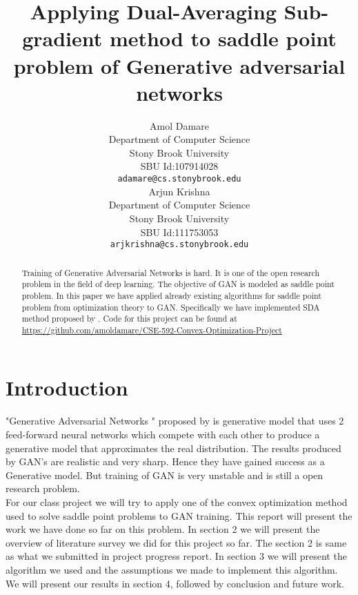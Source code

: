 \documentclass{article}
\title{\bf Applying Dual-Averaging Sub-gradient method to saddle point problem of Generative adversarial networks}
\author{
  Amol Damare \\
  Department of Computer Science\\
  Stony Brook University\\
  SBU Id:107914028\\
  \texttt{adamare@cs.stonybrook.edu} \\
  \And
Arjun Krishna \\
  Department of Computer Science \\
  Stony Brook University \\
  SBU Id:111753053\\
  \texttt{arjkrishna@cs.stonybrook.edu} \\
}
\begin{document}
\maketitle

\begin{abstract}
  Training of Generative Adversarial Networks is hard. It is one of the open research problem in the field of deep learning. The objective of GAN is modeled as saddle point problem. In this paper we have applied already existing algorithms for saddle point problem from optimization theory to GAN. Specifically we have implemented SDA method proposed by \citep{nesterov_primal-dual_2009}. Code for this project can be found at \url{https://github.com/amoldamare/CSE-592-Convex-Optimization-Project}
\end{abstract}

\section{Introduction}

"Generative Adversarial Networks " proposed by \cite{goodfellow_generative_2014} is generative model that uses 2 feed-forward neural networks which compete with each other to produce a generative model that approximates the real distribution. The results produced by GAN's are realistic and very sharp. Hence they have gained success as a Generative model. But training of GAN is very unstable and is still a open research problem.  \\
For our class project we will try to apply one of the convex optimization method used to solve  saddle point problems to GAN training. This report will present the work we have done so far on this problem.
In section 2 we will present the overview of literature survey we did for this project so far. The section 2 is same as what we submitted in project progress report. In section 3 we will present the algorithm we used and the assumptions we made to implement this algorithm. We will present our results in section 4, followed by conclusion and future work.
\end{document}

